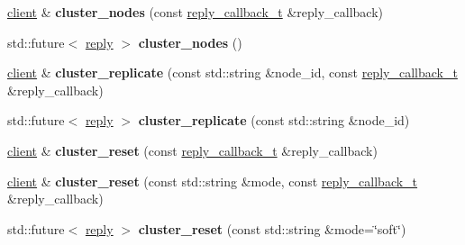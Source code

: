 \begin{DoxyCompactItemize}
\mbox{\label{classcpp__redis_1_1client_a1e4cc880ce249fcad1b1f6ddd15f515f}} 
\hyperlink{classcpp__redis_1_1client}{client} \& {\bfseries cluster\+\_\+nodes} (const \hyperlink{classcpp__redis_1_1client_a061a1140d36d2eaeda82b09a0bb3f9f2}{reply\+\_\+callback\+\_\+t} \&reply\+\_\+callback)
\item 
\mbox{\label{classcpp__redis_1_1client_a6e777dc7b54ecb4aff3e1c281f92dd81}} 
std\+::future$<$ \hyperlink{classcpp__redis_1_1reply}{reply} $>$ {\bfseries cluster\+\_\+nodes} ()
\item 
\mbox{\label{classcpp__redis_1_1client_a65688223390e47c0400ba4a128000f89}} 
\hyperlink{classcpp__redis_1_1client}{client} \& {\bfseries cluster\+\_\+replicate} (const std\+::string \&node\+\_\+id, const \hyperlink{classcpp__redis_1_1client_a061a1140d36d2eaeda82b09a0bb3f9f2}{reply\+\_\+callback\+\_\+t} \&reply\+\_\+callback)
\item 
\mbox{\label{classcpp__redis_1_1client_a4ce5b739522aefd5ca7c8aef8c76cc61}} 
std\+::future$<$ \hyperlink{classcpp__redis_1_1reply}{reply} $>$ {\bfseries cluster\+\_\+replicate} (const std\+::string \&node\+\_\+id)
\item 
\mbox{\label{classcpp__redis_1_1client_a99c86f1931c92594f2c14ac34b3d5dfd}} 
\hyperlink{classcpp__redis_1_1client}{client} \& {\bfseries cluster\+\_\+reset} (const \hyperlink{classcpp__redis_1_1client_a061a1140d36d2eaeda82b09a0bb3f9f2}{reply\+\_\+callback\+\_\+t} \&reply\+\_\+callback)
\item 
\mbox{\label{classcpp__redis_1_1client_a3f039634232d14d4eec6fea27784a347}} 
\hyperlink{classcpp__redis_1_1client}{client} \& {\bfseries cluster\+\_\+reset} (const std\+::string \&mode, const \hyperlink{classcpp__redis_1_1client_a061a1140d36d2eaeda82b09a0bb3f9f2}{reply\+\_\+callback\+\_\+t} \&reply\+\_\+callback)
\item 
\mbox{\label{classcpp__redis_1_1client_ac49706b4ea17538653a6e5a77791ae31}} 
std\+::future$<$ \hyperlink{classcpp__redis_1_1reply}{reply} $>$ {\bfseries cluster\+\_\+reset} (const std\+::string \&mode=\char`\"{}soft\char`\"{})

\end{DoxyCompactItemize}
